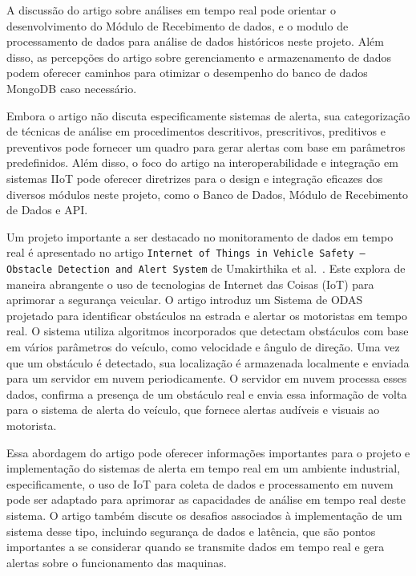 A discussão do artigo sobre análises em tempo real pode orientar o desenvolvimento do Módulo de Recebimento de dados, e o modulo de processamento de dados para análise de dados históricos neste projeto. Além disso, as percepções do artigo sobre gerenciamento e armazenamento de dados podem oferecer caminhos para otimizar o desempenho do banco de dados MongoDB caso necessário.

Embora o artigo não discuta especificamente sistemas de alerta, sua categorização de técnicas de análise em procedimentos descritivos, prescritivos, preditivos e preventivos pode fornecer um quadro para gerar alertas com base em parâmetros predefinidos. Além disso, o foco do artigo na interoperabilidade e integração em sistemas IIoT pode oferecer diretrizes para o design e integração eficazes dos diversos módulos neste projeto, como o Banco de Dados, Módulo de Recebimento de Dados e \gls{API}.

Um projeto importante a ser destacado no monitoramento de dados em tempo real é apresentado no artigo \texttt{Internet of Things in Vehicle Safety – Obstacle Detection and Alert System} de Umakirthika et al.~\cite{Umakirthika2018}. Este explora de maneira abrangente o uso de tecnologias de Internet das Coisas (IoT) para aprimorar a segurança veicular. O artigo introduz um Sistema de \gls{ODAS} projetado para identificar obstáculos na estrada e alertar os motoristas em tempo real. O sistema utiliza algoritmos incorporados que detectam obstáculos com base em vários parâmetros do veículo, como velocidade e ângulo de direção. Uma vez que um obstáculo é detectado, sua localização é armazenada localmente e enviada para um servidor em nuvem periodicamente. O servidor em nuvem processa esses dados, confirma a presença de um obstáculo real e envia essa informação de volta para o sistema de alerta do veículo, que fornece alertas audíveis e visuais ao motorista.

Essa abordagem do artigo pode oferecer informações importantes para o projeto e implementação do sistemas de alerta em tempo real em um ambiente industrial, especificamente, o uso de IoT para coleta de dados e processamento em nuvem pode ser adaptado para aprimorar as capacidades de análise em tempo real deste sistema. O artigo também discute os desafios associados à implementação de um sistema desse tipo, incluindo segurança de dados e latência, que são pontos importantes a se considerar quando se transmite dados em tempo real e gera alertas sobre o funcionamento das maquinas.

